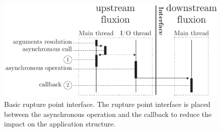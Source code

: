 \begin{figure}[h!]
\begin{center}
  \includegraphics[width=\linewidth]{ressources/basicrp.pdf}
  \caption{Basic rupture point interface. \textnormal{The rupture point interface is placed between the asynchronous operation and the callback to reduce the impact on the application structure.}}
  \label{fig:basicrp}
\end{center}
\end{figure}





